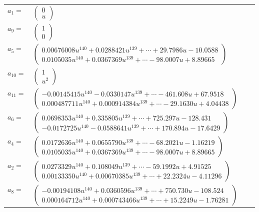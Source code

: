 \documentclass[1p]{elsarticle_modified}
\theoremstyle{definition}
\begin{document}
\begin{tabular}{m{7pt} m{180pt} m{7pt} m{180pt} }
\flushright $a_{1}=$&$\begin{pmatrix}0\\u\end{pmatrix}$ \\
\flushright $a_{9}=$&$\begin{pmatrix}1\\0\end{pmatrix}$ \\
\flushright $a_{5}=$&$\begin{pmatrix}0.00676008 u^{140}+0.0288421 u^{139}+\cdots+29.7986 u-10.0588\\0.0105035 u^{140}+0.0367369 u^{139}+\cdots-98.0007 u+8.89665\end{pmatrix}$ \\
\flushright $a_{10}=$&$\begin{pmatrix}1\\u^2\end{pmatrix}$ \\
\flushright $a_{11}=$&$\begin{pmatrix}-0.00145415 u^{140}-0.0330147 u^{139}+\cdots-461.608 u+67.9518\\0.000487711 u^{140}+0.000914384 u^{139}+\cdots-29.1630 u+4.04438\end{pmatrix}$ \\
\flushright $a_{6}=$&$\begin{pmatrix}0.0698353 u^{140}+0.335805 u^{139}+\cdots+725.297 u-128.431\\-0.0172725 u^{140}-0.0588641 u^{139}+\cdots+170.894 u-17.6429\end{pmatrix}$ \\
\flushright $a_{4}=$&$\begin{pmatrix}0.0172636 u^{140}+0.0655790 u^{139}+\cdots-68.2021 u-1.16219\\0.0105035 u^{140}+0.0367369 u^{139}+\cdots-98.0007 u+8.89665\end{pmatrix}$ \\
\flushright $a_{2}=$&$\begin{pmatrix}0.0273329 u^{140}+0.108049 u^{139}+\cdots-59.1992 u+4.91525\\0.00133350 u^{140}+0.00670385 u^{139}+\cdots+22.2324 u-4.11296\end{pmatrix}$ \\
\flushright $a_{8}=$&$\begin{pmatrix}-0.00194108 u^{140}+0.0360596 u^{139}+\cdots+750.730 u-108.524\\0.000164712 u^{140}+0.000743466 u^{139}+\cdots+15.2249 u-1.76281\end{pmatrix}$ \\

\end{tabular}
\end{document}
